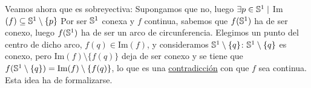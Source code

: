 \documentclass[12pt]{article}
\begin{document}
\begin{ejercicio}[2.5 puntos]
\begin{enumerate}
                \noindent
                Veamos ahora que es sobreyectiva:\newline
                Supongamos que no, luego $\exists p \in \mathbb{S}^1 \mid$ Im$(f) \subseteq \mathbb{S}^1 \setminus \{p\}$\newline
                Por ser $\mathbb{S}^1$ conexa y $f$ continua, sabemos que $f(\mathbb{S}^1)$ ha de ser conexo, luego $f(\mathbb{S}^1)$ ha de ser un arco de circunferencia.\newline
                Elegimos un punto del centro de dicho arco, $f(q) \in \mbox{Im}(f)$, y consideramos $\mathbb{S}^1\setminus \{q\}$:\newline
                $\mathbb{S}^1\setminus \{q\}$ es conexo, pero Im$(f) \setminus \{f(q)\}$ deja de ser conexo y se tiene que $f(\mathbb{S}^1\setminus \{q\}) = \mbox{Im}(f)\setminus \{f(q)\}$, lo que es una \underline{contradicción} con que $f$ sea continua. Esta idea ha de formalizarse. %

        \end{enumerate}
    \end{ejercicio}
\end{document}
